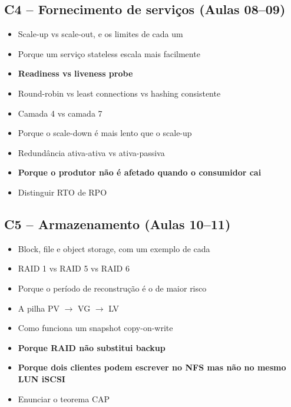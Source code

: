 \documentclass[11pt,a4paper]{article}
\begin{document}
\subsection*{C4 -- Fornecimento de serviços (Aulas 08--09)}
\begin{itemize}
  \item[$\square$] Scale-up vs scale-out, e os limites de cada um
  \item[$\square$] Porque um serviço stateless escala mais facilmente
  \item[$\square$] \textbf{Readiness vs liveness probe}
  \item[$\square$] Round-robin vs least connections vs hashing consistente
  \item[$\square$] Camada 4 vs camada 7
  \item[$\square$] Porque o scale-down é mais lento que o scale-up
  \item[$\square$] Redundância ativa-ativa vs ativa-passiva
  \item[$\square$] \textbf{Porque o produtor não é afetado quando o consumidor cai}
  \item[$\square$] Distinguir RTO de RPO
\end{itemize}

\subsection*{C5 -- Armazenamento (Aulas 10--11)}
\begin{itemize}
  \item[$\square$] Block, file e object storage, com um exemplo de cada
  \item[$\square$] RAID 1 vs RAID 5 vs RAID 6
  \item[$\square$] Porque o período de reconstrução é o de maior risco
  \item[$\square$] A pilha PV $\rightarrow$ VG $\rightarrow$ LV
  \item[$\square$] Como funciona um snapshot copy-on-write
  \item[$\square$] \textbf{Porque RAID não substitui backup}
  \item[$\square$] \textbf{Porque dois clientes podem escrever no NFS mas não no mesmo LUN iSCSI}
  \item[$\square$] Enunciar o teorema CAP
\end{itemize}
\end{document}

